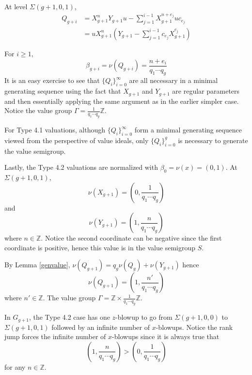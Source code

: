 \documentclass[11pt]{amsart}
\theoremstyle{definition}
\begin{document}
{At level $\Sigma(g+1,0,1)$,
\begin{equation*}
\begin{array}{rl}
\displaystyle Q_{g+i} & \displaystyle = X_{g+1}^{n}Y_{g+1}u-\sum_{j=1}^{i-1} X_{g+1}^{n+e_{j}}uc_{e_{j}} \\
& \displaystyle = uX_{g+1}^n\left(Y_{g+1}-\sum_{j=1}^{i-1} c_{e_j}X_{g+1}^{e_{j}}\right)
\end{array}
\end{equation*}

For $i\geq 1$,
\begin{equation*}
\beta_{g+i}=\nu(Q_{g+i})=\frac{n+e_i}{q_1\cdots q_g}
\end{equation*}
It is an easy exercise to see that $\displaystyle \{Q_i\}_{i=0}^{\infty}$ are all necessary in a minimal generating sequence using the fact that $X_{g+1}$ and $Y_{g+1}$ are regular parameters and then essentially applying the same argument as in the earlier simpler case. Notice the value group $\displaystyle \Gamma=\frac{1}{q_1\cdots q_g}\mathbb{Z}$.

For Type 4.1 valuations, although $\{Q_i\}_{i=0}^{\infty}$ form a minimal generating sequence viewed from the perspective of value ideals, only $\{Q_i\}_{i=0}^g$ is necessary to generate the value semigroup.

Lastly, the Type 4.2 valuations are normalized with $\beta_0=\nu(x)=(0,1)$. At $\Sigma(g+1,0,1)$,
\begin{equation*}
\nu(X_{g+1})=\left(0,\frac{1}{q_1\cdots q_g}\right)
\end{equation*}
and
\begin{equation*}
\nu(Y_{g+1})=\left(1,\frac{n}{q_1\cdots q_g}\right)
\end{equation*}
where $n\in\mathbb{Z}$. Notice the second coordinate can be negative since the first coordinate is positive, hence this value is in the value semigroup $S$.

By Lemma \ref{genvalue}, $\nu(Q_{g+1})=q_g \nu(Q_g)+\nu(Y_{g+1})$ hence
\begin{equation*}
\nu(Q_{g+1})=\left(1,\frac{n'}{q_1\cdots q_g}\right)
\end{equation*}
where $n'\in\mathbb{Z}$. The value group $\displaystyle \Gamma=\mathbb{Z}\times\frac{1}{q_1\cdots q_g}\mathbb{Z}$.

In $G_{g+1}$, the Type 4.2 case has one $z$-blowup to go from $\Sigma(g+1,0,0)$ to $\Sigma(g+1,0,1)$ followed by an infinite number of $x$-blowups. Notice the rank jump forces the infinite number of $x$-blowups since it is always true that
\begin{equation*}
\left(1,\frac{n}{q_1\cdots q_g}\right)>\left(0,\frac{1}{q_1\cdots q_g}\right)
\end{equation*}
for any $n \in\mathbb{Z}$.



}
\end{document}
